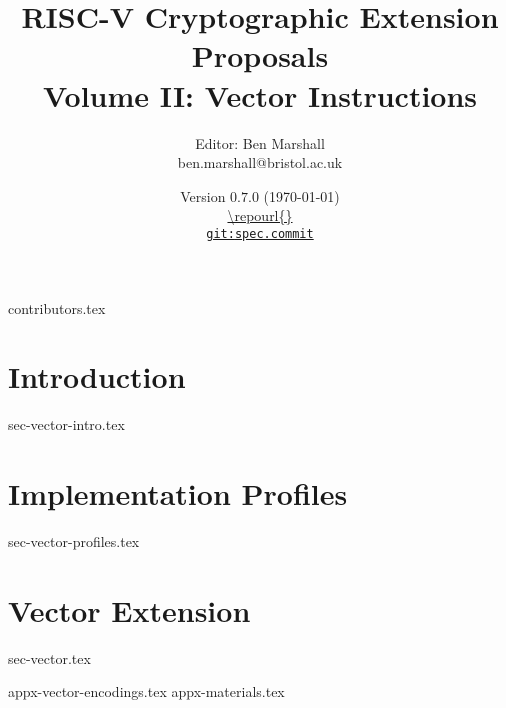 \documentclass[11pt]{article}
\title{RISC-V Cryptographic Extension Proposals\\Volume II: Vector Instructions}
\author{Editor: Ben Marshall\\ben.marshall@bristol.ac.uk}
\date{Version $0.7.0$ (\today) \\
\medskip
\url{\repourl{}} \\
\href{\repourl{}}{
{\small \tt git:{spec.commit}}}
}
\begin{document}

\maketitle

{contributors.tex}

\tableofcontents


\newpage
\section{Introduction}
\label{sec:intro}
{sec-vector-intro.tex}

\newpage
\section{Implementation Profiles}
\label{sec:profiles}
{sec-vector-profiles.tex}

\newpage
\section{Vector Extension}
\label{sec:vector}
{sec-vector.tex}


\newpage
\printbibliography


%
%

\newpage
\begin{appendices}
\label{sec:appendix}
{appx-vector-encodings.tex}
{appx-materials.tex}
\end{appendices}

\end{document}
